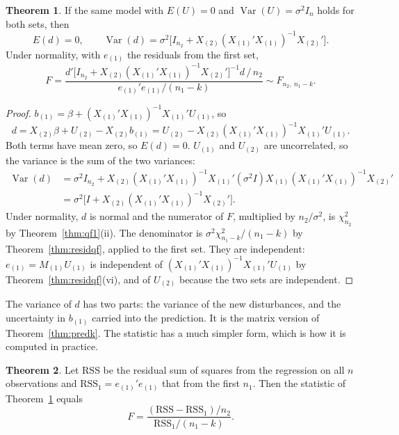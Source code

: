 \documentclass[11pt,a4paper]{article}
\numberwithin{equation}{section}
\DeclareMathOperator{\Var}{Var}
\theoremstyle{definition}
\newtheorem{thm}{Theorem}[subsection]
\begin{document}
\begin{thm}
\label{thm:chowd}
If the same model with $E(U) = 0$ and $\Var(U) = \sigma^2I_n$ holds for both sets, then
\[
E(d) = 0, \qquad \Var(d) = \sigma^2\bigl[I_{n_2} + X_{(2)}(X_{(1)}'X_{(1)})^{-1}X_{(2)}'\bigr] .
\]
Under normality, with $e_{(1)}$ the residuals from the first set,
\[
F = \frac{d'\bigl[I_{n_2} + X_{(2)}(X_{(1)}'X_{(1)})^{-1}X_{(2)}'\bigr]^{-1}d\,/\,n_2}{e_{(1)}'e_{(1)}/(n_1 - k)} \sim F_{n_2,\ n_1-k} .
\]
\end{thm}

\begin{proof}
$b_{(1)} = \beta + (X_{(1)}'X_{(1)})^{-1}X_{(1)}'U_{(1)}$, so
\[
d = X_{(2)}\beta + U_{(2)} - X_{(2)}b_{(1)} = U_{(2)} - X_{(2)}(X_{(1)}'X_{(1)})^{-1}X_{(1)}'U_{(1)} .
\]
Both terms have mean zero, so $E(d) = 0$. $U_{(1)}$ and $U_{(2)}$ are uncorrelated, so the variance is the sum of the two variances:
\begin{align*}
\Var(d) &= \sigma^2I_{n_2} + X_{(2)}(X_{(1)}'X_{(1)})^{-1}X_{(1)}'(\sigma^2I)X_{(1)}(X_{(1)}'X_{(1)})^{-1}X_{(2)}'\\
&= \sigma^2\bigl[I + X_{(2)}(X_{(1)}'X_{(1)})^{-1}X_{(2)}'\bigr] .
\end{align*}
Under normality, $d$ is normal and the numerator of $F$, multiplied by $n_2/\sigma^2$, is $\chi^2_{n_2}$ by Theorem~\ref{thm:qf1}(ii). The denominator is
$\sigma^2\chi^2_{n_1-k}/(n_1 - k)$ by Theorem~\ref{thm:residqf}, applied to the first set. They are independent: $e_{(1)} = M_{(1)}U_{(1)}$ is independent of
$(X_{(1)}'X_{(1)})^{-1}X_{(1)}'U_{(1)}$ by Theorem~\ref{thm:residqf}(vi), and of $U_{(2)}$ because the two sets are independent.
\end{proof}

The variance of $d$ has two parts: the variance of the new disturbances, and the uncertainty in $b_{(1)}$ carried into the prediction. It is the
matrix version of Theorem~\ref{thm:predk}. The statistic has a much simpler form, which is how it is computed in practice.

\begin{thm}
\label{thm:chowfrss}
Let $\text{RSS}$ be the residual sum of squares from the regression on all $n$ observations and $\text{RSS}_1 = e_{(1)}'e_{(1)}$ that from the first $n_1$.
Then the statistic of Theorem~\ref{thm:chowd} equals
\[
F = \frac{(\text{RSS} - \text{RSS}_1)/n_2}{\text{RSS}_1/(n_1 - k)} .
\]
\end{thm}
\end{document}
